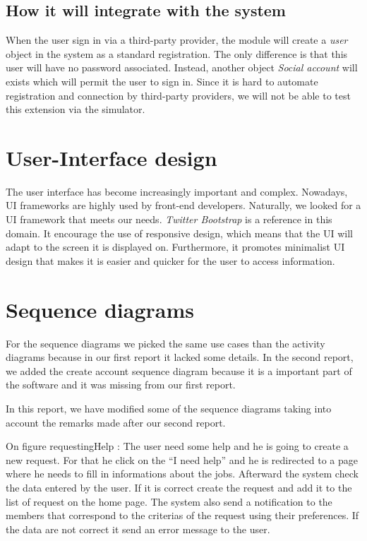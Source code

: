 \documentclass[11pt, a4paper]{article}   	%
\begin{document}
\subsection*{How it will integrate with the system}
When the user sign in via a third-party provider, the module will create a \textit{user} object in the system as a standard registration.
The only difference is that this user will have no password associated.
Instead, another object \textit{Social account} will exists which will permit the user to sign in.
Since it is hard to automate registration and connection by third-party providers, we will not be able to test this extension via the simulator.


\section{User-Interface design}
The user interface has become increasingly important and complex.
Nowadays, UI frameworks are highly used by front-end developers.
Naturally, we looked for a UI framework that meets our needs.
\textit{Twitter Bootstrap} is a reference in this domain.
It encourage the use of responsive design, which means that the UI will adapt to the screen it is displayed on.
Furthermore, it promotes minimalist UI design that makes it is easier and quicker for the user to access information.


\section{Sequence diagrams}

For the sequence diagrams we picked the same use cases than the activity diagrams because in our first report it lacked some details.
In the second report, we added the create account sequence diagram because it is a important part of the software and it was missing from our first report.

In this report, we have modified some of the sequence diagrams taking into account the remarks made after our second report.


On figure {requestingHelp} : The user need some help and he is going to create a new request. For that he click on the \enquote{I need help}
and he is redirected to a page where he needs to fill in informations about the jobs. Afterward the system check the data entered by the user.
If it is correct create the request and add it to the list of request on the home page. The system also send a notification to the members that
correspond to the criterias of the request using their preferences. If the data are not correct it send an error message to the user.
\end{document}

